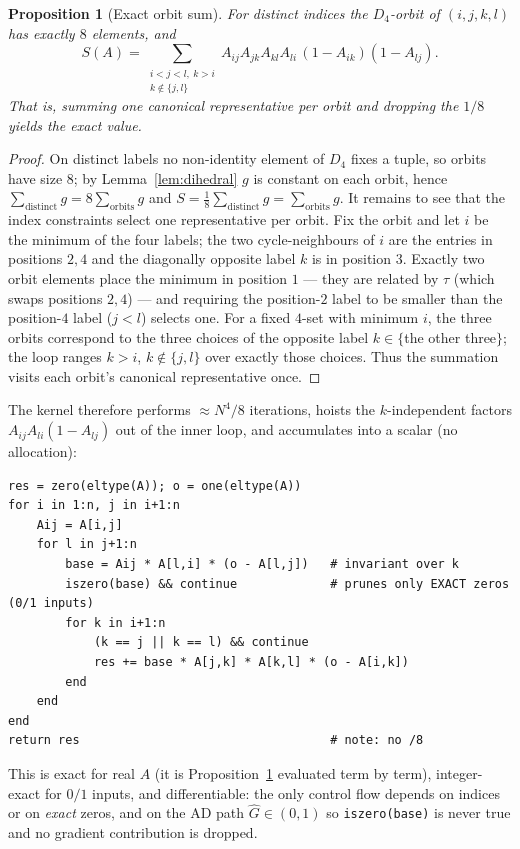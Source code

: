 \documentclass[11pt]{article}
\theoremstyle{plain}
\newtheorem{proposition}{Proposition}
\theoremstyle{definition}
\newcommand{\Ghat}{\hat{G}}
\begin{document}
\begin{proposition}[Exact orbit sum]\label{prop:squares}
For distinct indices the $D_4$-orbit of $(i,j,k,l)$ has exactly $8$ elements, and
\[
S(A)=\sum_{\substack{i<j<l,\ k>i\\ k\notin\{j,l\}}} A_{ij}A_{jk}A_{kl}A_{li}\,(1-A_{ik})(1-A_{lj}).
\]
That is, summing one canonical representative per orbit and dropping the $1/8$ yields the exact value.
\end{proposition}
\begin{proof}
On distinct labels no non-identity element of $D_4$ fixes a tuple, so orbits have size $8$; by
Lemma~\ref{lem:dihedral} $g$ is constant on each orbit, hence $\sum_{\text{distinct}}g=8\sum_{\text{orbits}}g$
and $S=\tfrac18\sum_{\text{distinct}}g=\sum_{\text{orbits}}g$. It remains to see that the index constraints
select one representative per orbit. Fix the orbit and let $i$ be the minimum of the four labels; the two
cycle-neighbours of $i$ are the entries in positions $2,4$ and the diagonally opposite label $k$ is in
position $3$. Exactly two orbit elements place the minimum in position $1$ --- they are related by $\tau$
(which swaps positions $2,4$) --- and requiring the position-$2$ label to be smaller than the position-$4$
label ($j<l$) selects one. For a fixed $4$-set with minimum $i$, the three orbits correspond to the three
choices of the opposite label $k\in\{$the other three$\}$; the loop ranges $k>i$, $k\notin\{j,l\}$ over
exactly those choices. Thus the summation visits each orbit's canonical representative once.
\end{proof}

The kernel therefore performs $\approx N^4/8$ iterations, hoists the $k$-independent factors
$A_{ij}A_{li}(1-A_{lj})$ out of the inner loop, and accumulates into a scalar (no allocation):
\begin{lstlisting}
res = zero(eltype(A)); o = one(eltype(A))
for i in 1:n, j in i+1:n
    Aij = A[i,j]
    for l in j+1:n
        base = Aij * A[l,i] * (o - A[l,j])   # invariant over k
        iszero(base) && continue             # prunes only EXACT zeros (0/1 inputs)
        for k in i+1:n
            (k == j || k == l) && continue
            res += base * A[j,k] * A[k,l] * (o - A[i,k])
        end
    end
end
return res                                   # note: no /8
\end{lstlisting}
This is exact for real $A$ (it is Proposition~\ref{prop:squares} evaluated term by term), integer-exact for
$0/1$ inputs, and differentiable: the only control flow depends on indices or on \emph{exact} zeros, and on
the AD path $\Ghat\in(0,1)$ so \texttt{iszero(base)} is never true and no gradient contribution is dropped.
\end{document}
